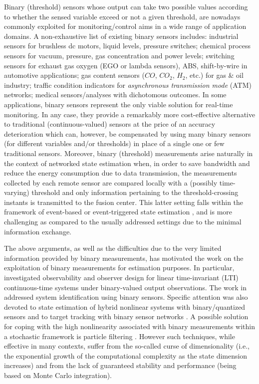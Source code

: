 \documentclass[11pt,journal,onecolumn]{IEEEtran}
\begin{document}
Binary (threshold) sensors whose output can take two possible values according to whether the sensed variable exceed or not a given threshold, are nowadays commonly exploited for monitoring/control aims in a wide range of application domains. A non-exhaustive list of existing binary sensors includes: industrial sensors for brushless dc motors, liquid levels, pressure switches; chemical process sensors for vacuum, pressure, gas concentration and power levels; switching sensors for exhaust gas oxygen (EGO or lambda sensors), ABS, shift-by-wire in automotive applications; gas content sensors ($CO$, $CO_2$, $H_2$, etc.) for gas \& oil industry; traffic condition indicators for \textit{asynchronous transmission mode} (ATM) networks; medical sensors/analyses with dichotomous outcomes. In some applications, binary sensors represent the only viable solution for real-time monitoring. In any case, they provide a remarkably more cost-effective alternative to traditional (continuous-valued) sensors at the price of an accuracy deterioration which can, however, be compensated by using many binary sensors (for different variables and/or thresholds) in place of a single one or few traditional sensors. Moreover, binary (threshold) measurements arise naturally in the context of networked state estimation when, in order to save bandwidth and reduce the energy consumption due to data transmission, the measurements collected by each remote sensor are compared locally with a (possibly time-varying) threshold and only information pertaining to the threshold-crossing instants is transmitted to the fusion center. This latter setting falls within the framework of event-based or event-triggered state estimation \cite{BaBeCh,Lazar,likelihood}, and is more challenging as compared to the usually addressed settings due to the minimal information exchange.

The above arguments, as well as the difficulties due to the very limited information provided by binary measurements, has motivated the work on the exploitation of binary measurements for estimation purposes. In particular, \cite{state_reconstruction,Irr-sampling} investigated observability and observer design for linear time-invariant (LTI) continuous-time systems under binary-valued output observations. The work in \cite{Wang1,Wang2} addressed system identification using binary sensors. Specific attention was also devoted to state estimation of hybrid nonlinear systems with binary/quantized sensors \cite{Koutsoukos} and to target tracking with binary sensor networks \cite{Aslam}. A possible solution for coping with the high nonlinearity associated with binary measurements within a stochastic framework is particle filtering \cite{Djuric_2,Ristic}. However such techniques, while effective in many contexts, suffer from the so-called curse of dimensionality (i.e., the exponential growth of the computational complexity as the state dimension increases) and from the lack of guaranteed stability and performance (being based on Monte Carlo integration).
\end{document}
